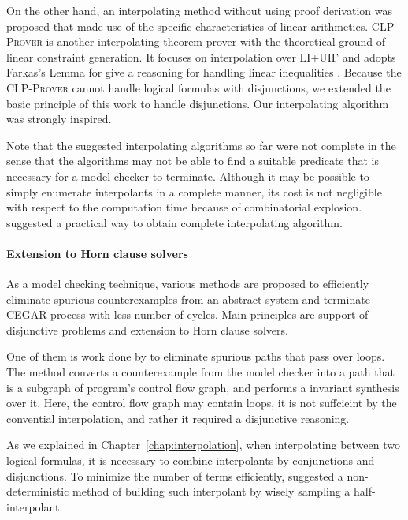 On the other hand, an interpolating method without using proof
derivation was proposed that made use of the specific characteristics
of linear arithmetics.  \textsc{CLP-Prover} \cite{website/clp} is
another interpolating theorem prover with the theoretical ground of
linear constraint generation.  It focuses on interpolation over LI+UIF
and adopts Farkas's Lemma \cite{journals/networks/Rajan90} for give a
reasoning for handling linear
inequalities \cite{conf/vmcai/RybalchenkoS07, conf/cav/Rybalchenko10}.
Because the \textsc{CLP-Prover} cannot handle logical formulas with
disjunctions, we extended the basic principle of this work to handle
disjunctions. Our interpolating algorithm was strongly inspired.

Note that the suggested interpolating algorithms so far were not
complete in the sense that the algorithms may not be able to find a
suitable predicate that is necessary for a model checker to terminate.
Although it may be possible to simply enumerate interpolants in a
complete manner, its cost is not negligible with respect to the
computation time because of combinatorial explosion.
\cite{conf/tacas/JhalaM06} suggested a practical way to
obtain complete interpolating algorithm.

\paragraph{Extension to Horn clause solvers}
As a model checking technique, various methods are proposed to
efficiently eliminate spurious counterexamples from an abstract system
and terminate CEGAR process with less number of cycles.  Main
principles are support of disjunctive problems and extension to Horn
clause solvers.

One of them is work done by \cite{conf/pldi/BeyerHMR07} to eliminate
spurious paths that pass over loops.  The method converts a
counterexample from the model checker into a path that is a subgraph
of program's control flow graph, and performs a invariant synthesis
over it.  Here, the control flow graph may contain loops, it is not
suffcieint by the convential interpolation, and rather it required a
disjunctive reasoning.

As we explained in Chapter~\ref{chap:interpolation}, when
interpolating between two logical formulas, it is necessary to combine
interpolants by conjunctions and disjunctions.  To minimize the number
of terms efficiently, \cite{conf/cav/AlbarghouthiM13} suggested a
non-deterministic method of building such interpolant by wisely
sampling a half-interpolant.

